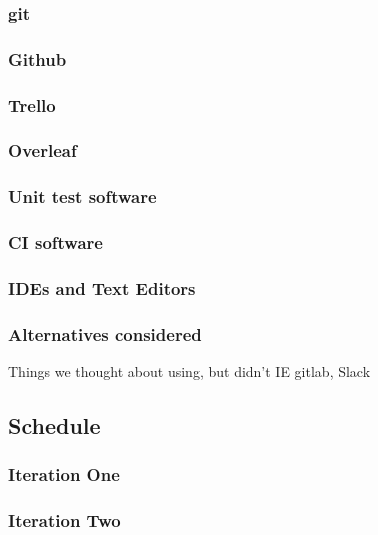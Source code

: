 \documentclass[a4paper]{article}
\begin{document}
\subsubsection{git}

\subsubsection{Github}

\subsubsection{Trello}

\subsubsection{Overleaf}

\subsubsection{Unit test software}

\subsubsection{CI software}

\subsubsection{IDEs and Text Editors}

\subsubsection{Alternatives considered}
Things we thought about using, but didn't IE gitlab, Slack

\subsection{Schedule}%

\subsubsection{Iteration One}

\subsubsection{Iteration Two}
\end{document}
